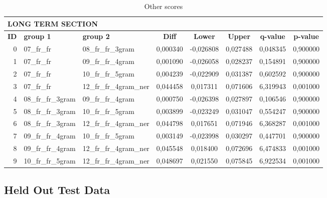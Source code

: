 \begin{table}[h!]
    \centering
    \caption{Other scores} %
    \label{tab:other_scores}
    \begin{tabular}{|r|l|l||c|c|c|c|c|}
        \hline
        \multicolumn{8}{|l|}{\textbf{LONG TERM SECTION}} \\ \hline\hline
        \textbf{ID} & \textbf{group 1} & \textbf{group 2} & \textbf{Diff} & \textbf{Lower} & \textbf{Upper} & \textbf{q-value} & \textbf{p-value} \\ \hline
        0 & 07\_fr\_fr & 08\_fr\_fr\_3gram & 0,000340 & -0,026808 & 0,027488 & 0,048345 & 0,900000 \\ \hline
        1 & 07\_fr\_fr & 09\_fr\_fr\_4gram & 0,001090 & -0,026058 & 0,028237 & 0,154891 & 0,900000 \\ \hline
        2 & 07\_fr\_fr & 10\_fr\_fr\_5gram & 0,004239 & -0,022909 & 0,031387 & 0,602592 & 0,900000 \\ \hline
        3 & 07\_fr\_fr & 12\_fr\_fr\_4gram\_ner & 0,044458 & 0,017311 & 0,071606 & 6,319943 & 0,001000 \\ \hline
        4 & 08\_fr\_fr\_3gram & 09\_fr\_fr\_4gram & 0,000750 & -0,026398 & 0,027897 & 0,106546 & 0,900000 \\ \hline
        5 & 08\_fr\_fr\_3gram & 10\_fr\_fr\_5gram & 0,003899 & -0,023249 & 0,031047 & 0,554247 & 0,900000 \\ \hline
        6 & 08\_fr\_fr\_3gram & 12\_fr\_fr\_4gram\_ner & 0,044798 & 0,017651 & 0,071946 & 6,368287 & 0,001000 \\ \hline
        7 & 09\_fr\_fr\_4gram & 10\_fr\_fr\_5gram & 0,003149 & -0,023998 & 0,030297 & 0,447701 & 0,900000 \\ \hline
        8 & 09\_fr\_fr\_4gram & 12\_fr\_fr\_4gram\_ner & 0,045548 & 0,018400 & 0,072696 & 6,474833 & 0,001000 \\ \hline
        9 & 10\_fr\_fr\_5gram & 12\_fr\_fr\_4gram\_ner & 0,048697 & 0,021550 & 0,075845 & 6,922534 & 0,001000 \\ \hline\hline
    \end{tabular}
\end{table}

\subsection{Held Out Test Data}\label{subsec:held_out}

